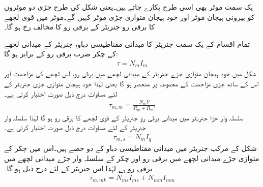 یک سمت  موٹر بھی اسی طرح پکارے جاتے ہیں۔یعنی شکل   کی طرح جڑی دو موٹروں کو بیرونی ہیجان موٹر اور خود ہیجان متوازی جڑی موٹر کہیں گے۔موٹر میں قوی لچھے کا برقی رو جنریٹر کے برقی رو کا مخالف رخ ہو گا۔

تمام اقسام کے یک سمت  جنریٹر کا میدانی مقناطیسی دباو، جنریٹر کے میدانی لچھے کے چکر ضرب برقی رو کے برابر ہو گا:
\begin{align}\label{مساوات_یک_سمت_میدانی_دباو}
\tau=N_m I_m
\end{align}
شکل   میں خود ہیجان متوازی جڑے جنریٹر کے میدانی لچھے میں برقی رو، اس لچھے کی مزاحمت  اور اس کے ساتھ جڑی مزاحمت کے مجموعہ   پر منحصر ہو گا یعنی  لہٰذا خود ہیجان متوازی جڑی جنریٹر کے لئے  مساوات   درج ذیل  صورت اختیار کرتی ہے۔
\begin{align}
\tau_{m,m}=\frac{N_m V}{R_m+R_m'}
\end{align}
سلسلہ وار جڑا جنریٹر میں میدانی برقی رو جنریٹر کے قوی لچھے کا برقی رو ہو گا لہٰذا سلسلہ وار جنریٹر کے لئے مساوات  درج ذیل صورت اختیار کرتی ہے۔
\begin{align}
\tau_{m,s}=N_m I_q
\end{align}
شکل   کے مرکب جنریٹر میں میدانی مقناطیسی دباو کے دو حصے ہیں۔اس میں  چکر کے متوازی جڑے میدانی لچھے میں برقی رو   اور   چکر کے سلسلہ وار جڑے میدانی لچھے میں  برقی رو  ہے لہٰذا اس جنریٹر کے لئے درج ذیل ہو گا۔
\begin{align}
\tau_{m,mk}=N_{ms} I_{ms}+N_{mm} I_{mm}
\end{align}

